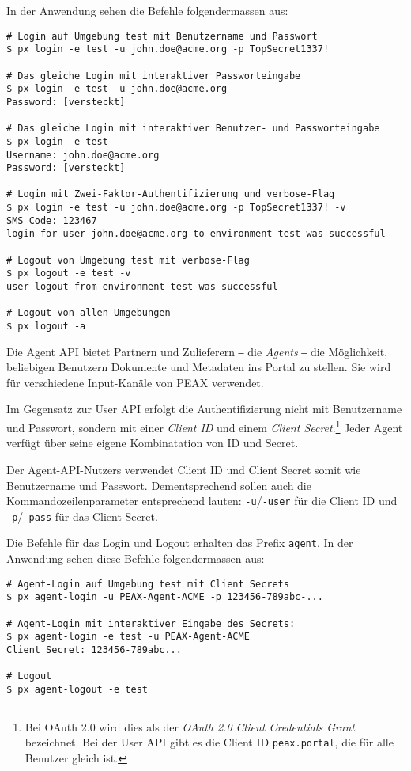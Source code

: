 In der Anwendung sehen die Befehle folgendermassen aus:

\begin{lstlisting}[caption={Anwendung der Befehle für Login und Logout}]
# Login auf Umgebung test mit Benutzername und Passwort
$ px login -e test -u john.doe@acme.org -p TopSecret1337!

# Das gleiche Login mit interaktiver Passworteingabe
$ px login -e test -u john.doe@acme.org
Password: [versteckt]

# Das gleiche Login mit interaktiver Benutzer- und Passworteingabe
$ px login -e test
Username: john.doe@acme.org
Password: [versteckt]

# Login mit Zwei-Faktor-Authentifizierung und verbose-Flag
$ px login -e test -u john.doe@acme.org -p TopSecret1337! -v
SMS Code: 123467
login for user john.doe@acme.org to environment test was successful

# Logout von Umgebung test mit verbose-Flag
$ px logout -e test -v
user logout from environment test was successful

# Logout von allen Umgebungen
$ px logout -a
\end{lstlisting}

Die Agent API bietet Partnern und Zulieferern ‒ die \textit{Agents} ‒ die Möglichkeit, beliebigen Benutzern Dokumente und Metadaten ins Portal zu stellen. Sie wird für verschiedene Input-Kanäle von PEAX verwendet.

Im Gegensatz zur User API erfolgt die Authentifizierung nicht mit Benutzername und Passwort, sondern mit einer \textit{Client ID} und einem \textit{Client Secret}.\footnote{Bei OAuth 2.0 wird dies als der \textit{OAuth 2.0 Client Credentials Grant} bezeichnet. Bei der User API gibt es die Client ID \texttt{peax.portal}, die für alle Benutzer gleich ist.} Jeder Agent verfügt über seine eigene Kombinatation von ID und Secret.

Der Agent-API-Nutzers verwendet Client ID und Client Secret somit wie Benutzername und Passwort. Dementsprechend sollen auch die Kommandozeilenparameter entsprechend lauten: \texttt{-u}/\texttt{-user} für die Client ID und \texttt{-p}/\texttt{-pass} für das Client Secret.

Die Befehle für das Login und Logout erhalten das Prefix \texttt{agent}. In der Anwendung sehen diese Befehle folgendermassen aus:

\begin{lstlisting}[caption={Anwendung der Befehle für Agent-Login und -Logout}]
# Agent-Login auf Umgebung test mit Client Secrets
$ px agent-login -u PEAX-Agent-ACME -p 123456-789abc-...

# Agent-Login mit interaktiver Eingabe des Secrets:
$ px agent-login -e test -u PEAX-Agent-ACME
Client Secret: 123456-789abc...

# Logout
$ px agent-logout -e test
\end{lstlisting}

